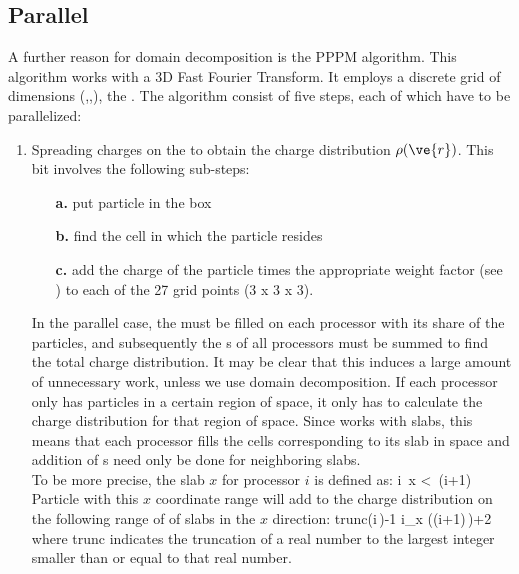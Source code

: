\subsection{Parallel }
A further reason for domain decomposition is the PPPM algorithm. This
algorithm works with a 3D Fast Fourier Transform. It employs a
discrete grid of dimensions (\nx,\ny,\nz), the {\fftgrid}. The
algorithm consist of five steps, each of which have to be
parallelized:
\begin{enumerate}
\item   Spreading charges on the {\fftgrid} to obtain the charge 
        distribution $\rho(\ve{r})$.
        This bit involves the following sub-steps:
        \begin{enumerate}
        \item[{\bf a.}] put particle in the box
        \item[{\bf b.}] find the {\fftgrid} cell in which the particle resides
        \item[{\bf c.}] add the charge of the particle times the appropriate
                        weight factor (see ) to 
                        each of the 27 grid points (3 x 3 x 3).
        \end{enumerate}
        In the parallel case, the {\fftgrid} 
        must be filled on each processor with its
        share of the particles, and subsequently the {\fftgrid}s of all processors
        must be summed to find the total charge distribution. It may be clear that
        this induces a large amount of unnecessary work, unless we use domain
        decomposition. If each processor only has particles in a certain region
        of space, it only has to calculate the charge distribution for 
        that region of space. Since {\gromacs} works with slabs, this means that
        each processor fills the {\fftgrid} cells corresponding to its slab in space
        and addition of {\fftgrid}s need only be done for neighboring slabs.\\
        To be more precise, the slab $x$ for processor $i$ is defined as:
        \beq
        i\,  \le x <\, (i+1)
        \eeq
        Particle with this $x$ coordinate range will add to the charge distribution
        on the following range of 
        of {\fftgrid} slabs in the $x$ direction:
        \beq
        {\rm trunc}\left(i\,\right)-1 \le i_x \left((i+1)\,\right)+2
        \eeq
        where trunc indicates the truncation of a real number to the largest integer
        smaller than or equal to that real number.
        

\end{enumerate}
